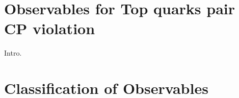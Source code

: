 

\section{Observables for Top quarks pair CP violation}
\label{sec:Observable}

Intro.

\section{Classification of Observables}
\label{ssec:Obs_Classification}


\FloatBarrier
